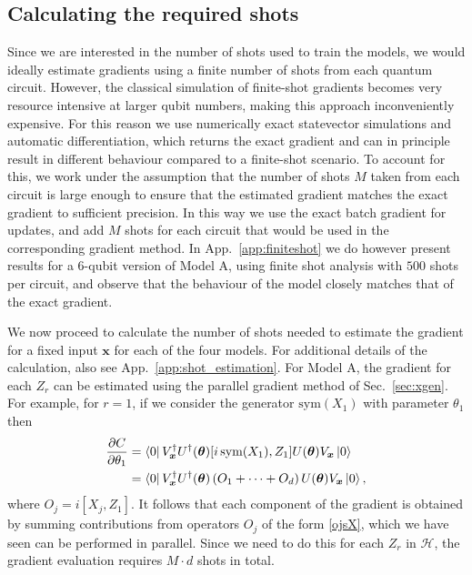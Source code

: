 \documentclass[twocolumn]{revtex4-2}
\renewcommand{\vec}{\boldsymbol}
\begin{document}
\subsection{Calculating the required shots}\label{sec:modelshots}
Since we are interested in the number of shots used to train the models, we would ideally estimate gradients using a finite number of shots from each quantum circuit. 
However, the classical simulation of finite-shot gradients becomes very resource intensive at larger qubit numbers, making this approach inconveniently expensive.
For this reason we use numerically exact statevector simulations and automatic differentiation, which returns the exact gradient and can in principle result in different behaviour compared to a finite-shot scenario. To account for this, we work under the assumption that the number of shots $M$ taken from each circuit is large enough to ensure that the estimated gradient matches the exact gradient to sufficient precision. In this way we use the exact batch gradient for updates, and add $M$ shots for each circuit that would be used in the corresponding gradient method. In App.\ \ref{app:finiteshot} we do however present results for a 6-qubit version of Model A, using finite shot analysis with $500$ shots per circuit, and observe that the behaviour of the model closely matches that of the exact gradient.

We now proceed to calculate the number of shots needed to estimate the gradient for a fixed input $\vec{x}$ for each of the four models. For additional details of the calculation, also see App.\ \ref{app:shot_estimation}. For Model A, the gradient for each $Z_r$ can be estimated using the parallel gradient method of Sec.\ \ref{sec:xgen}. For example, for $r=1$, if we consider the generator $\text{sym}(X_1)$ with parameter $\theta_1$ then 
\begin{align}
    \frac{\partial C}{\partial \theta_1} &= \bra{0}V_{\vec{x}}^\dagger U^\dagger(\vec{\theta})[i\,\text{sym}(X_1),Z_1] U(\vec{\theta})V_{\vec{x}}\ket{0}\nonumber\\
    &=\bra{0}V_{\vec{x}}^\dagger U^\dagger(\vec{\theta})\left(O_1+\cdots + O_d\right) U(\vec{\theta})V_{\vec{x}}\ket{0},
\end{align}
%
where $O_j=i[X_j,Z_1]$. It follows that each component of the gradient is obtained by summing contributions from operators $O_j$ of the form \eqref{ojsX}, which we have seen can be performed in parallel. Since we need to do this for each $Z_r$ in $\mathcal{H}$, the gradient evaluation requires $M\cdot d$ shots in total. 
\end{document}
